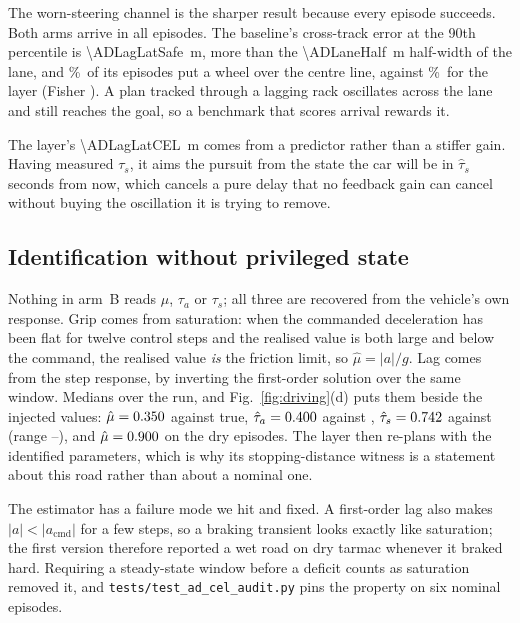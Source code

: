\documentclass[conference]{IEEEtran}
\theoremstyle{definition}
\begin{document}
The worn-steering channel is the sharper result because every episode succeeds.
Both arms arrive in all \ADLagN{} episodes. The baseline's cross-track error at
the 90th percentile is \SI{\ADLagLatSafe}{m}, more than the \SI{\ADLaneHalf}{m}
half-width of the lane, and \ADLagPaintSafe\%\ of its episodes put a wheel over
the centre line, against \ADLagPaintCEL\%\ for the layer (Fisher
\ADLagPaintP). A plan tracked through a lagging rack oscillates across the lane
and still reaches the goal, so a benchmark that scores arrival rewards it.

The layer's \SI{\ADLagLatCEL}{m} comes from a predictor rather than a stiffer
gain. Having measured $\tau_s$, it aims the pursuit from the state the car will
be in $\hat\tau_s$ seconds from now, which cancels a pure delay that no feedback
gain can cancel without buying the oscillation it is trying to remove.

\subsection{Identification without privileged state}

Nothing in arm~B reads $\mu$, $\tau_a$ or $\tau_s$; all three are recovered from
the vehicle's own response. Grip comes from saturation: when the commanded
deceleration has been flat for twelve control steps and the realised value is
both large and below the command, the realised value \emph{is} the friction
limit, so $\hat\mu=|a|/g$. Lag comes from the step response, by inverting the
first-order solution over the same window. Medians over the run, and
Fig.~\ref{fig:driving}(d) puts them beside the injected values:
$\hat\mu=0.350$ against \ADMuWet{} true, $\hat\tau_a=0.400$ against
\ADTauAWorn, $\hat\tau_s=0.742$ against \ADTauSWorn{} (range
\ADTauSHatLo--\ADTauSHatHi), and $\hat\mu=0.900$ on the dry episodes.
The layer then re-plans with the identified parameters, which is why its
stopping-distance witness is a statement about this road rather than about a
nominal one.

The estimator has a failure mode we hit and fixed. A first-order lag also makes
$|a|<|a_{\mathrm{cmd}}|$ for a few steps, so a braking transient looks exactly
like saturation; the first version therefore reported a wet road on dry tarmac
whenever it braked hard. Requiring a steady-state window before a deficit counts
as saturation removed it, and \texttt{tests/test\_ad\_cel\_audit.py} pins the
property on six nominal episodes.
\end{document}
